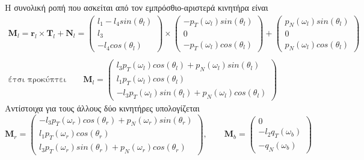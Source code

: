 Η συνολική ροπή που ασκείται από τον εμπρόσθιο-αριστερά κινητήρα είναι
\begin{gather*}
    \mathbf{M}_l = \mathbf{r}_l \times \mathbf{T}_l + \mathbf{N}_l =
    \begin{pmatrix}
        {l_1 - l_4 sin(\theta_l)} \\
        {l_3}                     \\
        {-l_4 cos(\theta_l)}
    \end{pmatrix} \times
    \begin{pmatrix}
        -p_T(\omega_l)sin(\theta_l) \\
        0                           \\
        -p_T(\omega_l)cos(\theta_l)
    \end{pmatrix} +
    \begin{pmatrix}
        p_N(\omega_l)sin(\theta_l) \\
        0                          \\
        p_N(\omega_l)cos(\theta_l)
    \end{pmatrix}  \\\\
    \text{έτσι προκύπτει}\qquad
    \mathbf{M}_l =
    \begin{pmatrix}
        {l_3 p_T(\omega_l)cos(\theta_l)+p_N(\omega_l)sin(\theta_l)} \\[3pt]
        {l_1 p_T(\omega_l)cos(\theta_l)}                            \\[3pt]
        {-l_3 p_T(\omega_l)sin(\theta_l)+p_N(\omega_l)cos(\theta_l)}
    \end{pmatrix}
\end{gather*}
Αντίστοιχα για τους άλλους δύο κινητήρες υπολογίζεται
\begin{equation*}
    \mathbf{M}_r =
    \begin{pmatrix}
        {-l_3 p_T(\omega_r)cos(\theta_r)+p_N(\omega_r)sin(\theta_r)} \\[3pt]
        {l_1 p_T(\omega_r)cos(\theta_r)}                             \\[3pt]
        {l_3 p_T(\omega_r)sin(\theta_r)+p_N(\omega_r)cos(\theta_r)}
    \end{pmatrix},\qquad
    \mathbf{M}_b =
    \begin{pmatrix}
        {0}                  \\[3pt]
        {-l_2 q_T(\omega_b)} \\[3pt]
        {-q_N(\omega_b)}
    \end{pmatrix}
\end{equation*}

